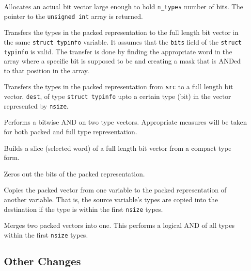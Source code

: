 Allocates an actual bit vector large enough to hold \texttt{n\_types}
number of bits. The pointer to the \texttt{unsigned int} array is
returned.


Transfers the types in the packed representation to the full length
bit vector in the same \texttt{struct typinfo} variable. It assumes
that the \texttt{bits} field of the \texttt{struct typinfo} is
valid. The transfer is done by finding the appropriate word in the
array where a specific bit is supposed to be and creating a mask that
is ANDed to that position in the array.


Transfers the types in the packed representation from \texttt{src} to
a full length bit vector, \texttt{dest}, of type \texttt{struct
typinfo} upto a certain type (bit) in the vector represented by
\texttt{nsize}.


Performs a bitwise AND on two type vectors. Appropriate measures
will be taken for both packed and full type representation.


Builds a slice (selected word) of a full length bit vector from a
compact type form.


Zeros out the bits of the packed representation.


Copies the packed vector from one variable to the packed
representation of another variable. That is, the source variable's
types are copied into the destination if the type is within the first
\texttt{nsize} types.


Merges two packed vectors into one. This performs a logical AND of
all types within the first \texttt{nsize} types.

\subsection{Other Changes}

